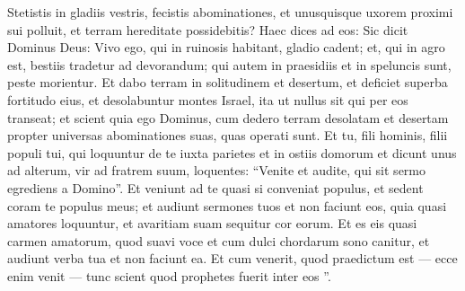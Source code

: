 \begin{biblechapter}
\begin{biblechapter}
\begin{biblechapter}
\begin{biblechapter}
\begin{biblechapter}
\begin{biblechapter}
\begin{biblechapter}
\begin{biblechapter}
\begin{biblechapter}
\begin{biblechapter}
\begin{biblechapter}
\begin{biblechapter}
\begin{biblechapter}
\begin{biblechapter}
\begin{biblechapter}
\begin{biblechapter}
\begin{biblechapter}
\begin{biblechapter}
\begin{biblechapter}
\begin{biblechapter}
\begin{biblechapter}
\begin{biblechapter}
\begin{biblechapter}
\begin{biblechapter}
\begin{biblechapter}
\begin{biblechapter}
\begin{biblechapter}
\begin{biblechapter}
\begin{biblechapter}
\begin{biblechapter}
\begin{biblechapter}
\begin{biblechapter}
\begin{biblechapter}
\verse Stetistis in gladiis vestris, fecistis abominationes, et unusquisque uxorem proximi sui polluit, et terram hereditate possidebitis? 
\verse Haec dices ad eos: Sic dicit Dominus Deus: Vivo ego, qui in ruinosis habitant, gladio cadent; et, qui in agro est, bestiis tradetur ad devorandum; qui autem in praesidiis et in speluncis sunt, peste morientur. 
\verse Et dabo terram in solitudinem et desertum, et deficiet superba fortitudo eius, et desolabuntur montes Israel, ita ut nullus sit qui per eos transeat; 
\verse et scient quia ego Dominus, cum dedero terram desolatam et desertam propter universas abominationes suas, quas operati sunt.
 \verse Et tu, fili hominis, filii populi tui, qui loquuntur de te iuxta parietes et in ostiis domorum et dicunt unus ad alterum, vir ad fratrem suum, loquentes: “Venite et audite, qui sit sermo egrediens a Domino”. 
\verse Et veniunt ad te quasi si conveniat populus, et sedent coram te populus meus; et audiunt sermones tuos et non faciunt eos, quia quasi amatores loquuntur, et avaritiam suam sequitur cor eorum. 
\verse Et es eis quasi carmen amatorum, quod suavi voce et cum dulci chordarum sono canitur, et audiunt verba tua et non faciunt ea. 
\verse Et cum venerit, quod praedictum est — ecce enim venit — tunc scient quod prophetes fuerit inter eos ”.
 

\end{biblechapter}
\end{biblechapter}
\end{biblechapter}
\end{biblechapter}
\end{biblechapter}
\end{biblechapter}
\end{biblechapter}
\end{biblechapter}
\end{biblechapter}
\end{biblechapter}
\end{biblechapter}
\end{biblechapter}
\end{biblechapter}
\end{biblechapter}
\end{biblechapter}
\end{biblechapter}
\end{biblechapter}
\end{biblechapter}
\end{biblechapter}
\end{biblechapter}
\end{biblechapter}
\end{biblechapter}
\end{biblechapter}
\end{biblechapter}
\end{biblechapter}
\end{biblechapter}
\end{biblechapter}
\end{biblechapter}
\end{biblechapter}
\end{biblechapter}
\end{biblechapter}
\end{biblechapter}
\end{biblechapter}
